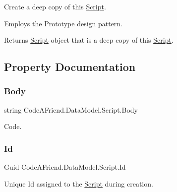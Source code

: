 Create a deep copy of this \mbox{\hyperlink{class_code_a_friend_1_1_data_model_1_1_script}{Script}}. 

Employs the Prototype design pattern.

\begin{DoxyReturn}{Returns}
\mbox{\hyperlink{class_code_a_friend_1_1_data_model_1_1_script}{Script}} object that is a deep copy of this \mbox{\hyperlink{class_code_a_friend_1_1_data_model_1_1_script}{Script}}.
\end{DoxyReturn}


\subsection{Property Documentation}
\mbox{\label{class_code_a_friend_1_1_data_model_1_1_script_a8d73e309856111b7666fe48f1b613eda}} 
\subsubsection{\texorpdfstring{Body}{Body}}
{\footnotesize\ttfamily string Code\+A\+Friend.\+Data\+Model.\+Script.\+Body\hspace{0.3cm}{\ttfamily [get]}}



Code.

\mbox{\label{class_code_a_friend_1_1_data_model_1_1_script_a91e1a0a804f19d83f904871d33998ce7}} 
\subsubsection{\texorpdfstring{Id}{Id}}
{\footnotesize\ttfamily Guid Code\+A\+Friend.\+Data\+Model.\+Script.\+Id\hspace{0.3cm}{\ttfamily [get]}}



Unique Id assigned to the \mbox{\hyperlink{class_code_a_friend_1_1_data_model_1_1_script}{Script}} during creation.

